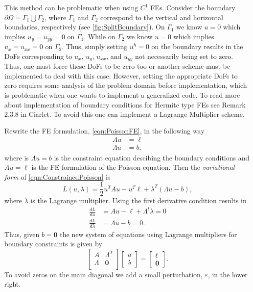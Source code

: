 This method can be problematic when using $C^1$ FEs. Consider the boundary
$\partial \Omega = \Gamma_1 \bigcup \Gamma_2$, where $\Gamma_1$ and $\Gamma_2$
correspond to the vertical and horizontal boundaries, respectively (see
\autoref{fig:SplitBoundary}).  On $\Gamma_1$ we know $u=0$ which implies $u_y =
u_{yy} = 0$ on $\Gamma_1$.  While on $\Gamma_2$ we know $u=0$ which implies $u_x
= u_{xx} = 0$ on $\Gamma_2$. Thus, simply setting $u^h = 0$ on the boundary
results in the DoFs corresponding to $u_x,\,u_y,\,u_{xx}$, and $u_{yy}$ not
necessarily being set to zero. Thus, one must force these DoFs to be zero too or
another scheme must be implemented to deal with this case. However, setting the
appropriate DoFs to zero requires some analysis of the problem domain before
implementation, which is problematic when one wants to implement a generalized
code. To read more about implementation of boundary conditions for Hermite type
FEs see Remark 2.3.8 in Ciarlet\cite{Ciarlet}. To avoid this one can implement a
Lagrange Multiplier scheme.


Rewrite the FE formulation, \eqref{eqn:PoissonFE}, in the following way
\begin{equation}
  \begin{split}
    A u &= \ell \\
    \Lambda u &= b,
  \end{split}
  \label{eqn:ConstrainedPoisson}
\end{equation}
where is $\Lambda u = b$ is the constraint equation descibing the boundary
conditions and $A u = \ell$ is the FE formulation of the Poisson equation.
Then the \emph{variational form} of \eqref{eqn:ConstrainedPoisson} is
\begin{equation}
  L(u,\lambda) = \frac{1}{2}u^T A u - u^T \ell + \lambda^T (\Lambda u - b),
  \label{eqn:Variational}
\end{equation}
where $\lambda$ is the Lagrange multiplier. Using the first derivative condition
results in
\begin{equation}
  \begin{split}
    \frac{d L}{du} &= Au - \ell + \Lambda^t \lambda = 0 \\
    \frac{d L}{d\lambda} &= \Lambda u - b = 0.
  \end{split}
  \label{eqn:Condition}
\end{equation}
Thus, given $b = \mathbf{0}$ the new system of equations using Lagrange
multipliers for boundary constraints is given by
\begin{equation}
  \begin{bmatrix}
    A & \Lambda^T \\
    \Lambda &  \mathbf{0} \\
  \end{bmatrix} \begin{bmatrix}
    u \\ \lambda
  \end{bmatrix} = \begin{bmatrix}
    \ell \\ \mathbf{0}
  \end{bmatrix}.
  \label{eqn:Lagrange}
\end{equation}
To avoid zeros on the main diagonal we add a small perturbation, $\varepsilon$,
in the lower right.
